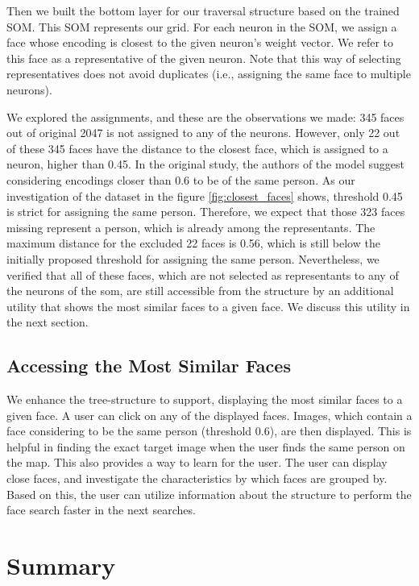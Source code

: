 Then we built the bottom layer for our traversal structure based on the trained SOM. This SOM represents our grid. For each neuron in the SOM, we assign a face whose encoding is closest to the given neuron's weight vector. We refer to this face as a representative of the given neuron.
Note that this way of selecting representatives does not avoid duplicates (i.e., assigning the same face to multiple neurons). 

We explored the assignments, and these are the observations we made: 345 faces out of original 2047 is not assigned to any of the neurons. However, only 22 out of these 345 faces have the distance to the closest face, which is assigned to a neuron, higher than 0.45. In the original study, the authors of the model suggest considering encodings closer than 0.6 to be of the same person. As our investigation of the dataset in the figure \ref{fig:closest_faces} shows, threshold 0.45 is strict for assigning the same person. Therefore, we expect that those 323 faces missing represent a person, which is already among the representants. The maximum distance for the excluded 22 faces is 0.56, which is still below the initially proposed threshold for assigning the same person. Nevertheless, we verified that all of these faces, which are not selected as representants to any of the neurons of the \acrshort{som}, are still accessible from the structure by an additional utility that shows the most similar faces to a given face. We discuss this utility in the next section.

\subsection{Accessing the Most Similar Faces}

We enhance the tree-structure to support, displaying the most similar faces to a given face. A user can click on any of the displayed faces. Images, which contain a face considering to be the same person (threshold 0.6), are then displayed. This is helpful in finding the exact target image when the user finds the same person on the map. This also provides a way to learn for the user. The user can display close faces, and investigate the characteristics by which faces are grouped by. Based on this, the user can utilize information about the structure to perform the face search faster in the next searches.

\section{Summary}

